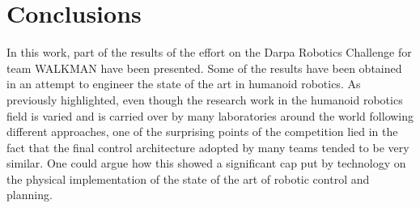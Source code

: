 \documentclass[%
	paper=A4,					%
	twoside=true,				%
	openright,			.
	parskip=full,				%
	chapterprefix=true,			%
	11pt,						%
	headings=normal,			%
	bibliography=totoc,			%
	listof=totoc,				%
	titlepage=on,				%
	captions=tableabove,		%
	draft=true,				%
]{scrreprt}%
\begin{document}
\chapter{Conclusions}

In this work, part of the results of the effort on the Darpa Robotics Challenge for team WALKMAN have been presented.
Some of the results have been obtained in an attempt to engineer the state of the art in humanoid robotics.
As previously highlighted, even though the research work in the humanoid robotics field is varied and is carried over by many laboratories around the world following different approaches, one of the surprising points of the competition lied in the fact that the final control architecture adopted by many teams tended to be very similar. One could argue how this showed a significant cap put by technology on the physical implementation of the state of the art of robotic control and planning.
\end{document}
